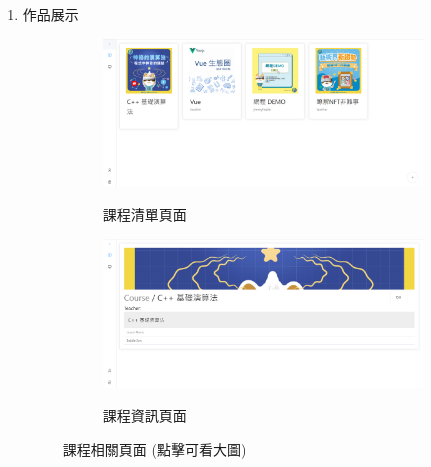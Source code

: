 \documentclass[12pt]{article}
\begin{document}
\begin{enumerate}
  \item 作品展示
    \begin{figure}[H]
      \begin{subfigure}{0.5\linewidth}
        \centering
        \href{https://raw.githubusercontent.com/programingtw/proglearn-plan/main/img/list.png}{ 
          \includegraphics[width=1\textwidth]{./img/list.png}
        }
        \caption{課程清單頁面}
      \end{subfigure}
      \label{arc6}
      \begin{subfigure}{0.5\linewidth}
        \centering
        \href{https://raw.githubusercontent.com/programingtw/proglearn-plan/main/img/course.png}{ 
          \includegraphics[width=1\textwidth]{./img/course.png}
        }
        \caption{課程資訊頁面}
      \end{subfigure}
      \label{arc7}
      \caption{課程相關頁面 (點擊可看大圖)}
    \end{figure}


\end{enumerate}
\end{document}

